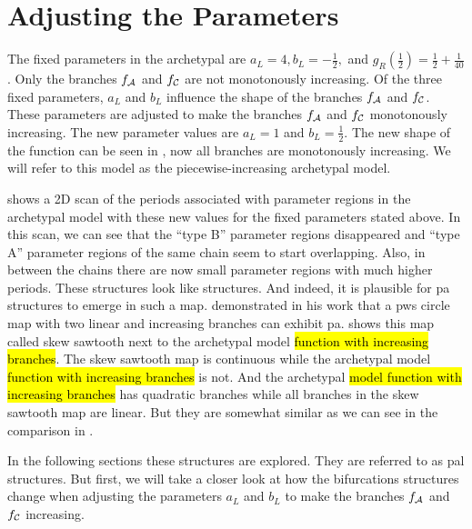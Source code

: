 \section{Adjusting the Parameters}
\label{sec:add.parameters}

The fixed parameters in the archetypal are $a_L = 4, b_L = -\frac{1}{2},$ and $g_R\left(\frac{1}{2}\right) = \frac{1}{2} + \frac{1}{40}$.
Only the branches $f_{\mathcal{A}}$ and $f_{\mathcal{C}}$ are not monotonously increasing.
Of the three fixed parameters, $a_L$ and $b_L$ influence the shape of the branches $f_{\mathcal{A}}$ and $f_{\mathcal{C}}$.
These parameters are adjusted to make the branches $f_{\mathcal{A}}$ and $f_{\mathcal{C}}$ monotonously increasing.
The new parameter values are $a_L = 1$ and $b_L = \frac{1}{2}$.
The new shape of the function can be seen in , now all branches are monotonously increasing.
We will refer to this model as the piecewise-increasing archetypal model.

 shows a 2D scan of the periods associated with parameter regions in the archetypal model with these new values for the fixed parameters stated above.
In this scan, we can see that the ``type B'' parameter regions disappeared and ``type A'' parameter regions of the same chain seem to start overlapping.
Also, in between the chains there are now small parameter regions with much higher periods.
These structures look like  structures.
And indeed, it is plausible for \gls{pa} structures to emerge in such a map.
 demonstrated in his work \cite{simpson2018saw} that a \gls{pws} circle map with two linear and increasing branches can exhibit \gls{pa}.
 shows this map called skew sawtooth next to the archetypal model \hl{function with increasing branches}.
The skew sawtooth map is continuous while the archetypal model \hl{function with increasing branches} is not.
And the archetypal \hl{model function with increasing branches} has quadratic branches while all branches in the skew sawtooth map are linear.
But they are somewhat similar as we can see in the comparison in .

In the following sections these structures are explored.
They are referred to as \gls{pal} structures.
But first, we will take a closer look at how the bifurcations structures change when adjusting the parameters $a_L$ and $b_L$ to make the branches $f_{\mathcal{A}}$ and $f_{\mathcal{C}}$ increasing.

